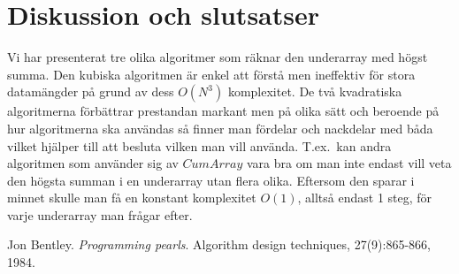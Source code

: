 \documentclass[a4paper,12pt]{article}
\begin{document}
\section{Diskussion och slutsatser}
\label{sec:disk}
Vi har presenterat tre olika algoritmer som räknar den underarray med högst
summa. Den kubiska algoritmen är enkel att förstå men ineffektiv för stora
datamängder på grund av dess $O\left(N^3\right)$ komplexitet. De två
kvadratiska algoritmerna förbättrar prestandan markant men på olika sätt och
beroende på hur algoritmerna ska användas så finner man fördelar och nackdelar
med båda vilket hjälper till att besluta vilken man vill använda. T.ex.~kan
andra algoritmen som använder sig av $CumArray$ vara bra om man inte endast
vill veta den högsta summan i en underarray utan flera olika. Eftersom den
sparar i minnet skulle man få en konstant komplexitet $O\left(1\right)$, alltså
endast 1 steg, för
varje underarray man frågar efter.
%
\begin{thebibliography}{99}
%
Jon Bentley. \textit{Programming pearls}.  Algorithm design techniques,
27(9):865-866, 1984.
%
\end{thebibliography}
\end{document}
